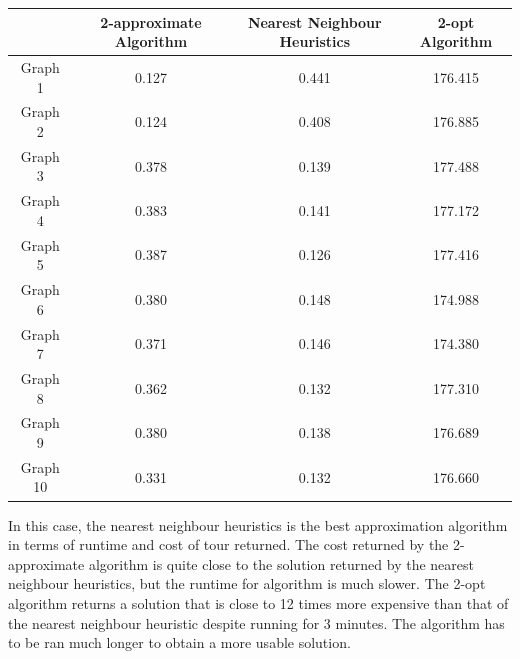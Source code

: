 \documentclass[paper=a4, fontsize=11pt]{scrartcl}	%
\numberwithin{equation}{section}		%
\numberwithin{figure}{section}			%
\numberwithin{table}{section}				%
\begin{document}
\begin{center}

\begin{tabular}{|c|c|c|c|}
\hline 
 & 2-approximate Algorithm & Nearest Neighbour Heuristics & 2-opt Algorithm \\ 
\hline 
Graph 1 & 0.127 & 0.441 & 176.415 \\ 
\hline 
Graph 2 & 0.124 & 0.408 & 176.885 \\ 
\hline 
Graph 3 & 0.378 & 0.139 & 177.488 \\ 
\hline 
Graph 4 & 0.383 & 0.141 & 177.172 \\ 
\hline 
Graph 5 & 0.387 & 0.126 & 177.416 \\ 
\hline 
Graph 6 & 0.380 & 0.148 & 174.988 \\ 
\hline 
Graph 7 & 0.371 & 0.146 & 174.380 \\ 
\hline 
Graph 8 & 0.362 & 0.132 & 177.310 \\ 
\hline 
Graph 9 &  0.380 & 0.138 & 176.689 \\ 
\hline 
Graph 10 & 0.331 & 0.132 & 176.660 \\ 
\hline 
\end{tabular} 
\end{center}

In this case, the nearest neighbour heuristics is the best approximation algorithm in terms of runtime and cost of tour returned. The cost returned by the 2-approximate algorithm is quite close to the solution returned by the nearest neighbour heuristics, but the runtime for algorithm is much slower. The 2-opt algorithm returns a solution that is close to 12 times more expensive than that of the nearest neighbour heuristic despite running for 3 minutes. The algorithm has to be ran much longer to obtain a more usable solution.
\end{document}
